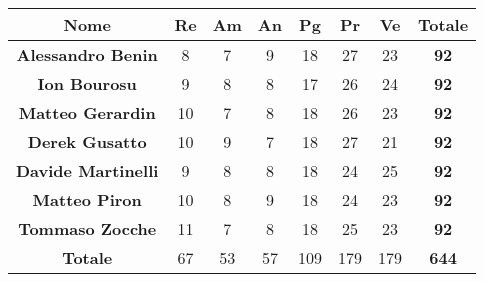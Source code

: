 \begin{table}[H]
    \centering
    \renewcommand{\arraystretch}{1.5}
    \begin{tabular}{|>{\bfseries}c|c|c|c|c|c|c|>{\bfseries}c|}
        \hline
        \rowcolor{gray!70} 
        \color{white}\textbf{Nome} & \color{white}\textbf{Re} & \color{white}\textbf{Am} & \color{white}\textbf{An} & \color{white}\textbf{Pg} & \color{white}\textbf{Pr} & \color{white}\textbf{Ve} & \color{white}\textbf{Totale} \\
        \hline
        \color{black}\textbf{Alessandro Benin} & 8 & 7 & 9 & 18 & 27 & 23 & 92 \\ 
        \hline
        \rowcolor{gray!10} %
        \color{black}\textbf{Ion Bourosu} & 9 & 8 & 8 & 17 & 26 & 24 & 92 \\ 
        \hline
        \color{black}\textbf{Matteo Gerardin} & 10 & 7 & 8 & 18 & 26 & 23 & 92 \\ 
        \hline
        \rowcolor{gray!10} %
        \color{black}\textbf{Derek Gusatto} & 10 & 9 & 7 & 18 & 27 & 21 & 92 \\ 
        \hline
         \color{black}\textbf{Davide Martinelli} & 9 & 8 & 8 & 18 & 24 & 25 & 92 \\ 
        \hline
        \rowcolor{gray!10} %
        \color{black}\textbf{Matteo Piron} & 10 & 8 & 9 & 18 & 24 & 23 & 92 \\ 
        \hline
        \color{black}\textbf{Tommaso Zocche} & 11 & 7 & 8 & 18 & 25 & 23 & 92 \\ 
        \hline
        \rowcolor{gray!70} 
        \color{white}\textbf{Totale} & \color{white}67 & \color{white}53 & \color{white}57 & \color{white}109 & \color{white}179 & \color{white}179 & \color{white}644 \\ 
        \hline
    \end{tabular}
    
\end{table}